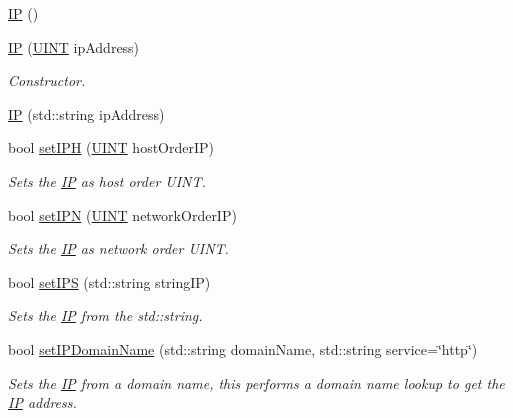 \begin{DoxyCompactItemize}
\item 
\hyperlink{class_communication_1_1_i_p_a9ec6616d8a10948e659f0388d1e73b9f}{I\+P} ()
\item 
\hyperlink{class_communication_1_1_i_p_af9a5fd13eb3458d2aad5d3289fb8f4d0}{I\+P} (\hyperlink{typedefs_8h_a2e2c38961834f28c06e17e074eb00bc7}{U\+I\+N\+T} ip\+Address)
\begin{DoxyCompactList}\small\item\em Constructor. \end{DoxyCompactList}\item 
\hyperlink{class_communication_1_1_i_p_aa08bd46a0a2b58a18df716f0d8187a86}{I\+P} (std\+::string ip\+Address)
\item 
bool \hyperlink{class_communication_1_1_i_p_adf0d88bbd3308f87ac69bd3f9f41020f}{set\+I\+P\+H} (\hyperlink{typedefs_8h_a2e2c38961834f28c06e17e074eb00bc7}{U\+I\+N\+T} host\+Order\+I\+P)
\begin{DoxyCompactList}\small\item\em Sets the \hyperlink{class_communication_1_1_i_p}{I\+P} as host order U\+I\+N\+T. \end{DoxyCompactList}\item 
bool \hyperlink{class_communication_1_1_i_p_a77c4c1e10474800730e6f42773322f58}{set\+I\+P\+N} (\hyperlink{typedefs_8h_a2e2c38961834f28c06e17e074eb00bc7}{U\+I\+N\+T} network\+Order\+I\+P)
\begin{DoxyCompactList}\small\item\em Sets the \hyperlink{class_communication_1_1_i_p}{I\+P} as network order U\+I\+N\+T. \end{DoxyCompactList}\item 
bool \hyperlink{class_communication_1_1_i_p_a697d49b98bd030a9b62dd49e43bcbf95}{set\+I\+P\+S} (std\+::string string\+I\+P)
\begin{DoxyCompactList}\small\item\em Sets the \hyperlink{class_communication_1_1_i_p}{I\+P} from the std\+::string. \end{DoxyCompactList}\item 
bool \hyperlink{class_communication_1_1_i_p_a290d0d4102c11d863de21088b3c98ea6}{set\+I\+P\+Domain\+Name} (std\+::string domain\+Name, std\+::string service=\char`\"{}http\char`\"{})
\begin{DoxyCompactList}\small\item\em Sets the \hyperlink{class_communication_1_1_i_p}{I\+P} from a domain name, this performs a domain name lookup to get the \hyperlink{class_communication_1_1_i_p}{I\+P} address. \end{DoxyCompactList}\item 

\end{DoxyCompactItemize}
